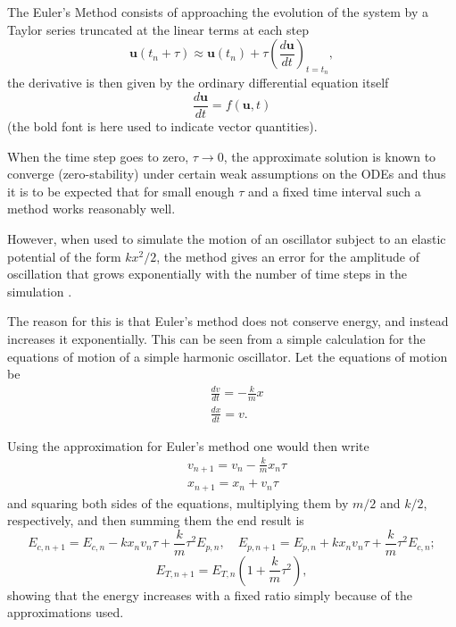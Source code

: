The Euler's Method consists of approaching the evolution of the system by a Taylor series truncated at the linear terms at each step
$$\mathbf{u}(t_n+\tau) \approx \mathbf{u}(t_n) + \tau\left( \frac{d\mathbf{u}}{dt}\right)_{t=t_n},$$
the derivative is then given by the ordinary differential equation itself
$$\frac{d\mathbf{u}}{dt} = f(\mathbf{u},t)$$
(the bold font is here used to indicate vector quantities).


When the time step goes to zero, $ \tau\to 0 $, the approximate solution is known to converge (zero-stability) under certain weak assumptions on the ODEs \cite{quarteroniNumericalMathematics2007} and thus it is to be expected that for small enough $ \tau $ and a fixed time interval such a method works reasonably well. 

However, when used to simulate the motion of an oscillator subject to an elastic potential of the form $k x^2/2$, the method gives an error for the amplitude of oscillation that grows exponentially with the number of time steps in the simulation \cite{giordanoComputationalPhysics1997}.

The reason for this is that Euler's method does not conserve energy, and instead increases it exponentially. This can be seen from a simple calculation for the equations of motion of a simple harmonic oscillator. Let the equations of motion be
\begin{equation*} \label{eq:2}
\begin{aligned}
&\frac{dv}{dt} = -\frac{k}{m}x\\
&\frac{dx}{dt}=v.
\end{aligned}
\end{equation*}

Using the approximation for Euler's method one would then write
\begin{equation*}
\begin{aligned}
&v_{n+1} = v_n -\frac{k}{m}x_n \tau\\
&x_{n+1} = x_n + v_n \tau
\end{aligned}
\end{equation*}
and squaring both sides of the equations, multiplying them by $m/2$ and $k/2$, respectively, and then summing them the end result is
$$
E_{c,n+1} = E_{c,n} -k x_n v_n \tau + \frac{k}{m} \tau^2 E_{p,n}, \quad
E_{p,n+1} = E_{p,n} + k x_n v_n \tau + \frac{k}{m} \tau^2 E_{c,n};
$$
\begin{equation*}
E_{T, n+1} = E_{T,n}\left(1 + \frac{k}{m}\tau^2\right),
\end{equation*}
showing that the energy increases with a fixed ratio simply because of the approximations used.

